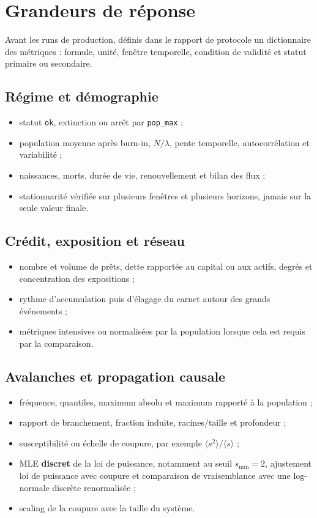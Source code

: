 \documentclass[11pt,a4paper]{article}
\newcommand{\code}[1]{\texttt{\color{navy}#1}}
\newcommand{\term}[1]{\textbf{\color{navy}#1}}
\begin{document}
\section{Grandeurs de réponse}

Avant les runs de production, définis dans le rapport de protocole un
dictionnaire des métriques : formule, unité, fenêtre temporelle, condition de
validité et statut primaire ou secondaire.

\subsection{Régime et démographie}

\begin{itemize}
  \item statut \code{ok}, extinction ou arrêt par \code{pop\_max} ;
  \item population moyenne après burn-in, $N/\lambda$, pente temporelle,
    autocorrélation et variabilité ;
  \item naissances, morts, durée de vie, renouvellement et bilan des flux ;
  \item stationnarité vérifiée sur plusieurs fenêtres et plusieurs horizons,
    jamais sur la seule valeur finale.
\end{itemize}

\subsection{Crédit, exposition et réseau}

\begin{itemize}
  \item nombre et volume de prêts, dette rapportée au capital ou aux actifs,
    degrés et concentration des expositions ;
  \item rythme d'accumulation puis d'élagage du carnet autour des grands
    événements ;
  \item métriques intensives ou normalisées par la population lorsque cela est
    requis par la comparaison.
\end{itemize}

\subsection{Avalanches et propagation causale}

\begin{itemize}
  \item fréquence, quantiles, maximum absolu et maximum rapporté à la
    population ;
  \item rapport de branchement, fraction induite, racines/taille et profondeur ;
  \item susceptibilité ou échelle de coupure, par exemple
    $\langle s^2\rangle/\langle s\rangle$ ;
  \item MLE \term{discret} de la loi de puissance, notamment au seuil
    $s_{\min}=2$, ajustement loi de puissance avec coupure et comparaison de
    vraisemblance avec une log-normale discrète renormalisée ;
  \item scaling de la coupure avec la taille du système.
\end{itemize}
\end{document}

